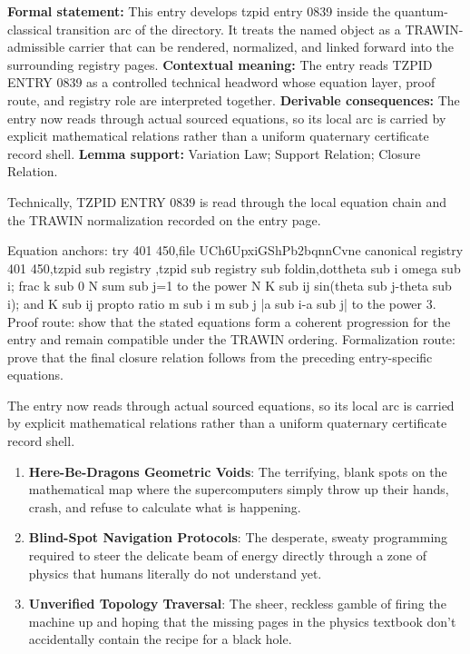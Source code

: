 \begingroup\footnotesize\setlength{\emergencystretch}{3em}\sloppy
\textbf{Formal statement:} This entry develops tzpid entry 0839 inside the quantum-classical transition arc of the directory. It treats the named object as a TRAWIN-admissible carrier that can be rendered, normalized, and linked forward into the surrounding registry pages. \textbf{Contextual meaning:} The entry reads TZPID ENTRY 0839 as a controlled technical headword whose equation layer, proof route, and registry role are interpreted together. \textbf{Derivable consequences:} The entry now reads through actual sourced equations, so its local arc is carried by explicit mathematical relations rather than a uniform quaternary certificate record shell. \textbf{Lemma support:} Variation Law; Support Relation; Closure Relation.\par
\endgroup

Technically, TZPID ENTRY 0839 is read through the local equation chain and the TRAWIN normalization recorded on the entry page.

Equation anchors: try 401 450,file UCh6UpxiGShPb2bqnnCvne canonical registry 401 450,tzpid sub registry ,tzpid sub registry sub foldin,dottheta sub i omega sub i; frac k sub 0 N sum sub j=1 to the power N K sub ij sin(theta sub j-theta sub i); and K sub ij propto ratio m sub i m sub j |a sub i-a sub j| to the power 3. Proof route: show that the stated equations form a coherent progression for the entry and remain compatible under the TRAWIN ordering. Formalization route: prove that the final closure relation follows from the preceding entry-specific equations.

The entry now reads through actual sourced equations, so its local arc is carried by explicit mathematical relations rather than a uniform quaternary certificate record shell.
\endgroup

\begin{enumerate}[leftmargin=1.6em,itemsep=6pt,topsep=4pt]
\item \textbf{Here-Be-Dragons Geometric Voids}: The terrifying, blank spots on the mathematical map where the supercomputers simply throw up their hands, crash, and refuse to calculate what is happening.
\item \textbf{Blind-Spot Navigation Protocols}: The desperate, sweaty programming required to steer the delicate beam of energy directly through a zone of physics that humans literally do not understand yet.
\item \textbf{Unverified Topology Traversal}: The sheer, reckless gamble of firing the machine up and hoping that the missing pages in the physics textbook don't accidentally contain the recipe for a black hole.
\end{enumerate}

